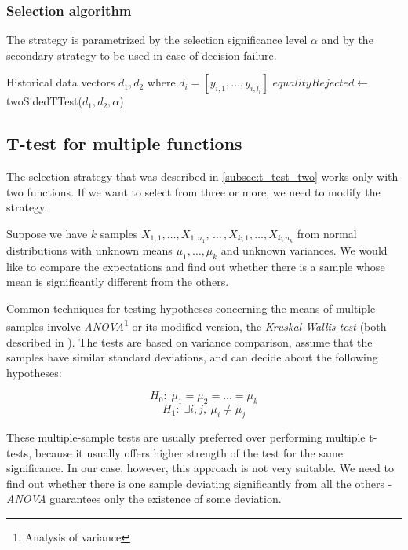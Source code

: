 \subsubsection{Selection algorithm}

The strategy is parametrized by the selection significance level $\alpha$ and by the secondary strategy to be used in case of decision failure.

\begin{algorithmic}[1] %
	\INPUT Historical data vectors $d_1,d_2$ where $d_i = [y_{i,1},\dots, y_{i,l_i}]$
	\State $equalityRejected \gets$ twoSidedTTest($d_1, d_2, \alpha$)
	\State {}
	\EndIf
	\State {}
	\Else 
	\State {}
	\EndIf
\end{algorithmic}

\subsection{T-test for multiple functions}
\label{subsec:t_test_multiple}

The selection strategy that was described in \ref{subsec:t_test_two} works only with two functions. If we want to select from three or more, we need to modify the strategy.

Suppose we have $k$ samples $X_{1,1}, \dots, X_{1, n_1}, \, \dots \, , X_{k,1}, \dots, X_{k, n_k}$ from normal distributions with unknown means $\mu_1, \dots, \mu_k$ and unknown variances. We would like to compare the expectations and find out whether there is a sample whose mean is significantly different from the others.

Common techniques for testing hypotheses concerning the means of multiple samples involve \textit{ANOVA}\footnote{Analysis of variance} or its modified version, the \textit{Kruskal-Wallis test} (both described in \cite{weiss_introductory_2010}). The tests are based on variance comparison, assume that the samples have similar standard deviations, and can decide about the following hypotheses:


\[
H_0: \; \mu_1 = \mu_2 = \dots = \mu_k
\]
\[
H_1: \; \exists i, j, \ \mu_i \neq \mu_j
\]

These multiple-sample tests are usually preferred over performing multiple \mbox{t-tests}, because it usually offers higher strength of the test for the same significance. In our case, however, this approach is not very suitable. We need to find out whether there is one sample deviating significantly from all the others - \textit{ANOVA} guarantees only the existence of some deviation.


